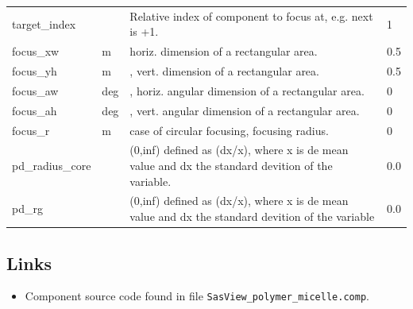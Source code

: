\begin{longtable}{p{}p{}p{}p{}}
target\_index &   & Relative index of component to focus at, e.g. next is +1. & 1 \\
focus\_xw & m & horiz. dimension of a rectangular area. & 0.5 \\
focus\_yh & m & , vert. dimension of a rectangular area. & 0.5 \\
focus\_aw & deg & , horiz. angular dimension of a rectangular area. & 0 \\
focus\_ah & deg & , vert. angular dimension of a rectangular area. & 0 \\
focus\_r & m & case of circular focusing, focusing radius. & 0 \\
pd\_radius\_core &  & (0,inf) defined as (dx/x), where x is de mean value and dx the standard devition of the variable. & 0.0 \\
pd\_rg &  & (0,inf) defined as (dx/x), where x is de mean value and dx the standard devition of the variable & 0.0 \\
\bottomrule
\end{longtable}

\subsection*{Links}
\begin{itemize}
  \item Component source code found in file \texttt{SasView\_polymer\_micelle.comp}.
\end{itemize}
